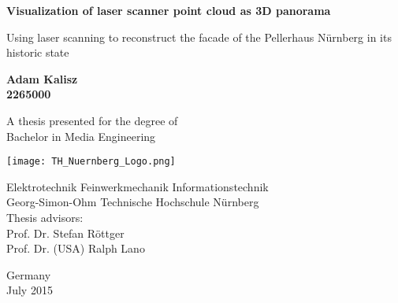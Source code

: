 \begin{titlepage}
	\begin{center}
		\vspace*{1cm}
		
		\Huge
		\textbf{Visualization of laser scanner point cloud as 3D panorama}
		
		\vspace{0.5cm}
		\LARGE
		Using laser scanning to reconstruct the facade of the Pellerhaus Nürnberg in its historic state
		
		\vspace{1.5cm}
		
		\textbf{Adam Kalisz}\\
		\textbf{2265000}\\
		
		\vspace{1.5cm}
				
		
		A thesis presented for the degree of\\
		Bachelor in Media Engineering
		
		\vfill
		
		\vspace{0.8cm}
		
		{\texttt{[image: TH\_Nuernberg\_Logo.png]}}
		
		\Large
		Elektrotechnik Feinwerkmechanik Informationstechnik\\
		Georg-Simon-Ohm Technische Hochschule Nürnberg\\
		
		\vspace{0.8cm}
		Thesis advisors:\\
		Prof. Dr. Stefan Röttger\\
		Prof. Dr. (USA) Ralph Lano\\	
		\vspace{0.8cm}
		
		
		Germany\\
		July 2015
		
		
		
	\end{center}
\end{titlepage}